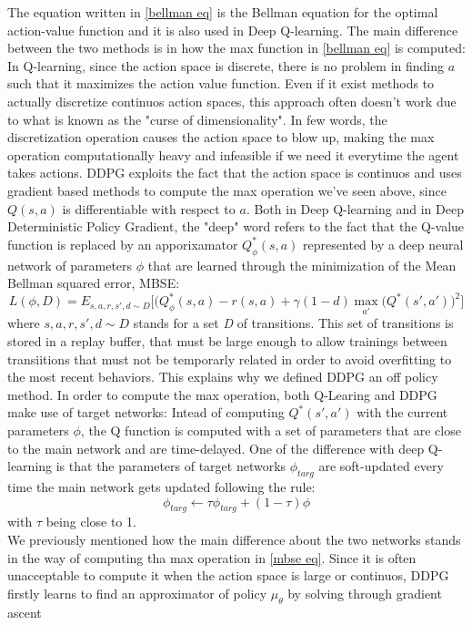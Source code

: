 \documentclass[a4paper]{report}
\begin{document}
The equation written in \ref{bellman eq} is the Bellman equation for the optimal action-value function and it is also used in Deep Q-learning. The main difference between the two methods is in how the max function in \ref{bellman eq} is computed: In Q-learning, since the action space is discrete, there is no problem in finding $a$ such that it maximizes the action value function. Even if it exist methods to actually discretize continuos action spaces, this approach often doesn't work due to what is known as the "curse of dimensionality". In few words, the discretization operation causes the action space to blow up, making the max operation computationally heavy and infeasible if we need it everytime the agent takes actions. DDPG exploits the fact that the action space is continuos and uses gradient based methods to compute the max operation we've seen above, since $Q(s,a)$ is differentiable with respect to $a$. Both in Deep Q-learning and in Deep Deterministic Policy Gradient, the "deep" word refers to the fact that the Q-value function is replaced by an apporixamator $Q_{\phi}^{*}(s,a)$ represented by a deep neural network of parameters $\phi$ that are learned through the minimization of the Mean Bellman squared error, MBSE:
\begin{equation} \label{mbse eq}
L(\phi, \textit{D}) = E_{s,a,r,s',d \sim \textit{D}}\biggl[\bigl(Q_{\phi}^{*}(s,a) - r(s,a) + \gamma(1-d)  \max_{a'}(Q^*(s',a')
\bigr)^2
\biggr]
\end{equation}
where $s,a,r,s',d \sim \textit{D}$ stands for a set \textit{D} of transitions. This set of transitions is stored in a replay buffer, that must be large enough to allow trainings between transiitions that must not be temporarly related in order to avoid overfitting to the most recent behaviors. This explains why we defined DDPG an off policy method. In order to compute the max operation, both Q-Learing and DDPG make use of target networks: Intead of computing $Q^*(s',a')$ with the current parameters $\phi$, the Q function is computed with a set of parameters that are close to the main network and are time-delayed. One of the difference with deep Q-learning is that the parameters of target networks $\phi_{targ} $ are soft-updated every time the main network gets updated following the rule:
\begin{equation} \label{soft update rule}
\phi_{targ} \leftarrow \tau \phi_{targ} + (1- \tau) \phi
\end{equation}
with $\tau$ being close to 1.\\
We previously mentioned how the main difference about the two networks stands in the way of computing tha max operation in \ref{mbse eq}. Since it is often unacceptable to compute it when the action space is large or continuos, DDPG firstly learns to find an approximator of policy $\mu_{\theta}$ by solving through gradient ascent
\end{document}

